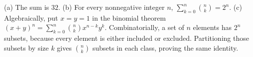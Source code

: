(a) The sum is $\boxed{32}$. (b) For every nonnegative integer $n$, $\sum_{k=0}^n\binom nk=\boxed{2^n}$. (c) Algebraically, put $x=y=1$ in the binomial theorem $(x+y)^n=\sum_{k=0}^n\binom nkx^{n-k}y^k$. Combinatorially, a set of $n$ elements has $2^n$ subsets, because every element is either included or excluded. Partitioning those subsets by size $k$ gives $\binom nk$ subsets in each class, proving the same identity.
